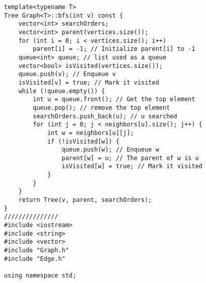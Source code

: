 \documentclass{article}
\begin{document}
\begin{lstlisting}
template<typename T>
Tree Graph<T>::bfs(int v) const {
    vector<int> searchOrders;
    vector<int> parent(vertices.size());
    for (int i = 0; i < vertices.size(); i++)
        parent[i] = -1; // Initialize parent[i] to -1
    queue<int> queue; // list used as a queue
    vector<bool> isVisited(vertices.size());
    queue.push(v); // Enqueue v
    isVisited[v] = true; // Mark it visited
    while (!queue.empty()) {
        int u = queue.front(); // Get the top element
        queue.pop(); // remove the top element
        searchOrders.push_back(u); // u searched
        for (int j = 0; j < neighbors[u].size(); j++) {
            int w = neighbors[u][j];
            if (!isVisited[w]) {
                queue.push(w); // Enqueue w
                parent[w] = u; // The parent of w is u
                isVisited[w] = true; // Mark it visited
            }
        }
    }
    return Tree(v, parent, searchOrders);
}
///////////////
#include <iostream>
#include <string>
#include <vector>
#include "Graph.h"
#include "Edge.h"

using namespace std;


\end{lstlisting}
\end{document}
